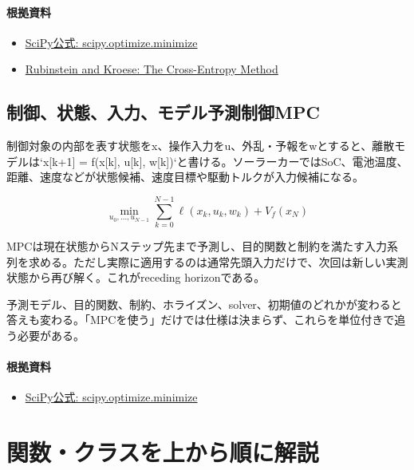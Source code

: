 \documentclass[a4paper,11pt]{article}
\begin{document}
\paragraph{根拠資料}
\begin{itemize}[leftmargin=1.6em]
\item \href{https://docs.scipy.org/doc/scipy/reference/generated/scipy.optimize.minimize.html}{SciPy公式: scipy.optimize.minimize}
\item \href{https://link.springer.com/book/10.1007/978-1-4757-4321-0}{Rubinstein and Kroese: The Cross-Entropy Method}
\end{itemize}

\subsection{制御、状態、入力、モデル予測制御MPC}
制御対象の内部を表す状態をx、操作入力をu、外乱・予報をwとすると、離散モデルは`x[k+1] = f(x[k], u[k], w[k])`と書ける。ソーラーカーではSoC、電池温度、距離、速度などが状態候補、速度目標や駆動トルクが入力候補になる。


\[
\min_{u_0,\ldots,u_{N-1}} \sum_{k=0}^{N-1}\ell(x_k,u_k,w_k)+V_f(x_N)
\]

MPCは現在状態からNステップ先まで予測し、目的関数と制約を満たす入力系列を求める。ただし実際に適用するのは通常先頭入力だけで、次回は新しい実測状態から再び解く。これがreceding horizonである。


予測モデル、目的関数、制約、ホライズン、solver、初期値のどれかが変わると答えも変わる。「MPCを使う」だけでは仕様は決まらず、これらを単位付きで追う必要がある。

\paragraph{根拠資料}
\begin{itemize}[leftmargin=1.6em]
\item \href{https://docs.scipy.org/doc/scipy/reference/generated/scipy.optimize.minimize.html}{SciPy公式: scipy.optimize.minimize}
\end{itemize}



        \section{関数・クラスを上から順に解説}
\end{document}
